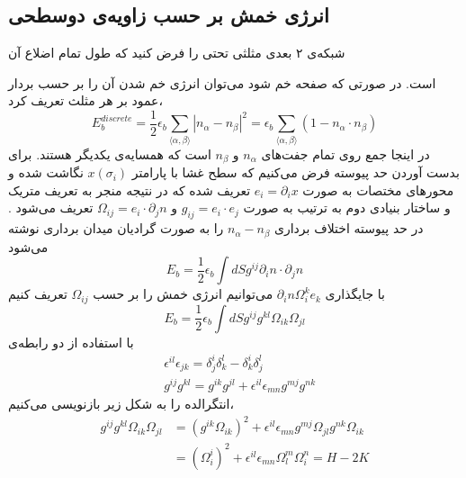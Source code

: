 \setRL



\subsection{
انرژی خمش بر حسب زاویه‌ی دوسطحی
}
 شبکه‌ی ۲ بعدی مثلثی تحتی را فرض کنید که طول تمام اضلاع آن 
 
 است. در صورتی که صفحه خم شود می‌توان انرژی خم شدن آن را بر حسب بردار عمود بر هر مثلث تعریف کرد،
\begin{equation}
E_b^{discrete}=\frac{1}{2}\epsilon_b\sum_{\langle\alpha,\beta\rangle}|n_\alpha-n_\beta|^2=\epsilon_b\sum_{\langle\alpha,\beta\rangle}\left(1-n_\alpha\cdot n_\beta\right)
\label{eq:bending}
\end{equation}
در اینجا جمع روی تمام جفت‌های 
$n_\alpha$
و 
$n_\beta$ 
است که همسایه‌ی یکدیگر هستند. برای بدست‌ آوردن حد پیوسته‌ فرض می‌کنیم که سطح غشا با پارامتر 
$x(\sigma_i)$
نگاشت شده و محورهای مختصات به صورت 
$e_i=\partial_ix$
تعریف شده که در نتیجه منجر به تعریف متریک و ساختار بنیادی دوم
 به ترتیب به صورت 
$g_{ij}=e_i\cdot e_j$
و
$\Omega_{ij}=e_i\cdot\partial_jn$
تعریف می‌شود 
\cite{DubrovinModernGeometry}
. در حد پیوسته اختلاف برداری 
$n_\alpha-n_\beta$
را به صورت گرادیان میدان برداری نوشته می‌شود
\begin{equation}
E_b=\frac{1}{2}\epsilon_b\int dSg^{ij}\partial_in\cdot\partial_jn
\end{equation}
با جایگذاری 
$\partial_in\Omega_i^ke_k$
می‌توانیم انرژی خمش را بر حسب 
$\Omega_{ij}$
تعریف کنیم
\begin{equation}
E_b=\frac{1}{2}\epsilon_b\int dSg^{ij}g^{kl}\Omega_{ik}\Omega_{jl}
\end{equation}
با استفاده از دو رابطه‌ی 
\begin{equation}
\begin{aligned}
&\epsilon^{il}\epsilon_{jk}=\delta_j^i\delta_k^l-\delta_k^i\delta_j^l\\
&g^{ij}g^{kl}=g^{ik}g^{jl}+\epsilon^{il}\epsilon_{mn}g^{mj}g^{nk}
\end{aligned}
\end{equation}
انتگرالده را به شکل زیر بازنویسی می‌کنیم،
\begin{equation}
\begin{aligned}
g^{ij}g^{kl}\Omega_{ik}\Omega_{jl}&=(g^{ik}\Omega_{ik})^2+\epsilon^{il}\epsilon_{mn}g^{mj}\Omega_{jl}g^{nk}\Omega_{ik}\\
&=(\Omega_i^i)^2+\epsilon^{il}\epsilon_{mn}\Omega_l^m\Omega_i^n=H-2K
\end{aligned}
\end{equation}
